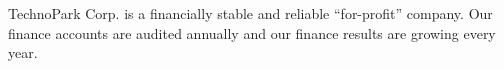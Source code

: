 
TechnoPark Corp. is a financially stable and reliable ``for-profit'' company. Our
finance accounts are audited annually and our finance results are growing
every year.
